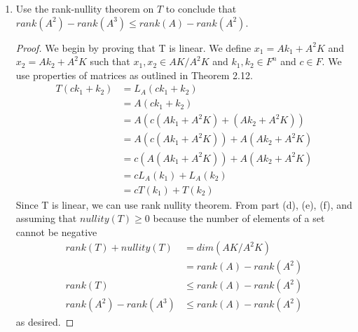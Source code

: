 \documentclass[11pt]{scrartcl}
\begin{document}
\begin{enumerate}[label=\alph*.]
{\begin{proof}
		      We must show that $\forall y \in A^2K/A^2K [\exists x \in AK/A^2K : T(x) = y$].
		      Let $y \in A^2K/A^3K$ such that $y = A^2k + A^3K$ where $k \in \mathbb{F}^n$.
		      We claim that $T(x) = y$ where $x = Ak + A^2K$.
		      \begin{align*}
			      T(x) & = T(Ak + A^2K)        \\
			           & = L_A(Ak + A^2K)      \\
			           & = L_A(Ak) + L_A(A^2K) \\
			           & = A^2k + A^3K         \\
			           & = y
		      \end{align*}
		      as desired. Therefore, $T$ is onto i.e. $R(T) = A^2K/A^3K$.
	      \end{proof}
	      }
	\item{
	      Use the rank-nullity theorem on $T$ to conclude that $rank(A^2) - rank(A^3) \leq rank(A) - rank(A^2)$.
	      \begin{proof}
		      We begin by proving that T is linear. We define $x_1 = Ak_1 + A^2K$ and $x_2 = Ak_2 + A^2K$
		      such that $x_1, x_2 \in AK/A^2K$ and $k_1, k_2 \in F^n$ and $c \in F$. We use properties of matrices
		      as outlined in Theorem 2.12.
		      \begin{align*}
			      T(ck_1 + k_2) & = L_A(ck_1 + k_2)                    \\
			                    & = A(ck_1 + k_2)                      \\
			                    & = A(c(Ak_1 + A^2K) + (Ak_2 + A^2K))  \\
			                    & = A(c(Ak_1 + A^2K)) + A(Ak_2 + A^2K) \\
			                    & = c(A(Ak_1 + A^2K)) + A(Ak_2 + A^2K) \\
			                    & = cL_A(k_1)+ L_A(k_2)                \\
			                    & = cT(k_1)+ T(k_2)
		      \end{align*}
		      Since T is linear, we can use rank nullity theorem. From part (d), (e), (f), and assuming that $nullity(T) \geq 0$ because the number of elements of a set cannot be negative
		      \begin{align*}
			      rank(T) + nullity(T)  & = dim(AK/A^2K)           \\
			                            & = rank(A) - rank(A^2)    \\
			      rank(T)               & \leq rank(A) - rank(A^2) \\
			      rank(A^2) - rank(A^3) & \leq rank(A) - rank(A^2)
		      \end{align*}
		      as desired.
	      \end{proof}
	      }
\end{enumerate}
\end{document}
